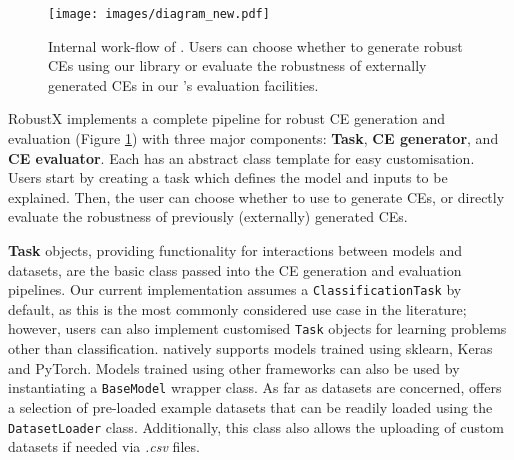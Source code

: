 \begin{figure}[ht!]
    \centering
    \texttt{[image: images/diagram\_new.pdf]}
    \caption{Internal work-flow of \name{}. Users can choose whether to generate robust CEs using our library or evaluate the robustness of externally generated CEs in our \name{}'s evaluation facilities. }
    \label{fig:robustx}
\end{figure}

RobustX implements a complete pipeline for robust CE generation and evaluation (Figure \ref{fig:robustx}) with three major components: \textbf{Task}, \textbf{CE generator}, and \textbf{CE evaluator}. Each has an abstract class template for easy customisation. Users start by creating a task which defines the model and inputs to be explained. Then, the user can choose whether to use \name{} to generate CEs, or directly evaluate the robustness of previously (externally) generated CEs.

\textbf{Task} objects, providing functionality for interactions between models and datasets, are the basic class passed into the CE generation and evaluation pipelines. Our current implementation assumes a \texttt{ClassificationTask} by default, as this is the most commonly considered use case in the literature; however, users can also implement customised \texttt{Task} objects for learning problems other than classification. \name{} natively supports models trained using sklearn\;\cite{pedregosa2011scikit}, Keras\;\cite{chollet2015keras} and PyTorch\;\cite{pytorch}. Models trained using other frameworks can also be used by instantiating a \texttt{BaseModel} wrapper class. As far as datasets are concerned, \name{} offers a selection of pre-loaded example datasets that can be readily loaded using the \texttt{DatasetLoader} class. Additionally, this class also allows the uploading of custom datasets if needed via \textit{.csv} files. 

